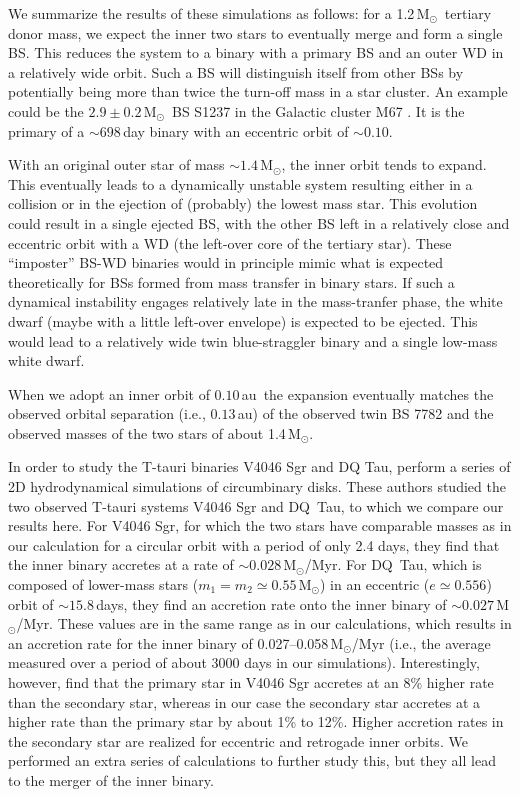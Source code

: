 \documentclass[twocolumn]{aastex62}
\newcommand{\MSun}{\mbox{M$_\odot$}}
\begin{document}
We summarize the results of these simulations as follows: for a
1.2\,\MSun\, tertiary donor mass, we expect the inner two stars to
eventually merge and form a single BS. This reduces the system to a
binary with a primary BS and an outer WD in a relatively wide
orbit. Such a BS will distinguish itself from other BSs by potentially
being more than twice the turn-off mass in a star cluster.  An example
could be the $2.9\pm0.2$\,\MSun\, BS S1237 in the Galactic cluster M67
\citep{2016ApJ...832L..13L}. It is the primary of a $\sim 698$\,day
binary with an eccentric orbit of $\sim 0.10$.

With an original outer star of mass $\sim 1.4$\,\MSun, the inner orbit
tends to expand. This eventually leads to a dynamically unstable
system resulting either in a collision or in the ejection of
(probably) the lowest mass star. This evolution could result in a
single ejected BS, with the other BS left in a relatively close and
eccentric orbit with a WD (the left-over core of the tertiary star).
These ``imposter'' BS-WD binaries would in principle mimic what is
expected theoretically for BSs formed from mass transfer in binary
stars. If such a dynamical instability engages relatively late in the
mass-tranfer phase, the white dwarf (maybe with a little left-over
envelope) is expected to be ejected. This would lead to a relatively
wide twin blue-straggler binary and a single low-mass white dwarf.

When we adopt an inner orbit of $0.10$\,au\, the expansion eventually
matches the observed orbital separation (i.e., $0.13$\,au) of the
observed twin BS 7782 and the observed masses of the two stars of
about 1.4\,\MSun.

In order to study the T-tauri binaries V4046 Sgr and DQ Tau,
\cite{2011MNRAS.413.2679D} perform a series of 2D hydrodynamical
simulations of circumbinary disks.  These authors studied the two
observed T-tauri systems V4046 Sgr and DQ~Tau, to which we compare our
results here.  For V4046 Sgr, for which the two stars have comparable
masses as in our calculation for a circular orbit with a period of
only 2.4 days, they find that the inner binary accretes at a rate of
$\sim 0.028$\,\MSun/Myr.  For DQ~Tau, which is composed of lower-mass
stars ($m_1 = m_2 \simeq 0.55$\,\MSun) in an eccentric ($e\simeq
0.556$) orbit of $\sim 15.8$\,days, they find an accretion rate onto
the inner binary of $\sim 0.027$\,\MSun/Myr.  These values are in the
same range as in our calculations, which results in an accretion rate
for the inner binary of 0.027--0.058\,\MSun/Myr (i.e., the average
measured over a period of about 3000 days in our simulations).
Interestingly, however, \cite{2011MNRAS.413.2679D} find that the
primary star in V4046 Sgr accretes at an 8\% higher rate than the
secondary star, whereas in our case the secondary star accretes at a
higher rate than the primary star by about 1\% to 12\%.  Higher
accretion rates in the secondary star are realized for eccentric and
retrogade inner orbits. We performed an extra series of calculations
to further study this, but they all lead to the merger of the inner
binary.
\end{document}
